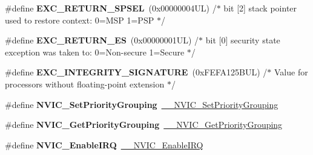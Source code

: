 \begin{DoxyCompactItemize}
\#define {\bfseries E\+X\+C\+\_\+\+R\+E\+T\+U\+R\+N\+\_\+\+S\+P\+S\+EL}~(0x00000004\+U\+L)     /$\ast$ bit \mbox{[}2\mbox{]} stack pointer used to restore context\+: 0=\+M\+S\+P 1=\+P\+S\+P           $\ast$/
\item 
\mbox{\label{group___c_m_s_i_s___core___n_v_i_c_functions_gac939dbf69d3063c76a28516a4ae84db7}} 
\#define {\bfseries E\+X\+C\+\_\+\+R\+E\+T\+U\+R\+N\+\_\+\+ES}~(0x00000001\+U\+L)     /$\ast$ bit \mbox{[}0\mbox{]} security state exception was taken to\+: 0=\+Non-\/secure 1=\+Secure $\ast$/
\item 
\mbox{\label{group___c_m_s_i_s___core___n_v_i_c_functions_ga7d1b21b2d863ccd9e23a3295b3173155}} 
\#define {\bfseries E\+X\+C\+\_\+\+I\+N\+T\+E\+G\+R\+I\+T\+Y\+\_\+\+S\+I\+G\+N\+A\+T\+U\+RE}~(0x\+F\+E\+F\+A125\+B\+U\+L)     /$\ast$ Value for processors without floating-\/point extension                $\ast$/
\item 
\mbox{\label{group___c_m_s_i_s___core___n_v_i_c_functions_ga0e798d5aec68cdd8263db86a76df788f}} 
\#define {\bfseries N\+V\+I\+C\+\_\+\+Set\+Priority\+Grouping}~\mbox{\hyperlink{group___c_m_s_i_s___core___n_v_i_c_functions_gafc94dcbaee03e4746ade1f5bb9aaa56d}{\+\_\+\+\_\+\+N\+V\+I\+C\+\_\+\+Set\+Priority\+Grouping}}
\item 
\mbox{\label{group___c_m_s_i_s___core___n_v_i_c_functions_ga4eeb9214f2264fc23c34ad5de2d3fa11}} 
\#define {\bfseries N\+V\+I\+C\+\_\+\+Get\+Priority\+Grouping}~\mbox{\hyperlink{group___c_m_s_i_s___core___n_v_i_c_functions_ga9b894af672df4373eb637f8288845c05}{\+\_\+\+\_\+\+N\+V\+I\+C\+\_\+\+Get\+Priority\+Grouping}}
\item 
\mbox{\label{group___c_m_s_i_s___core___n_v_i_c_functions_ga57b3064413dbc7459d9646020fdd8bef}} 
\#define {\bfseries N\+V\+I\+C\+\_\+\+Enable\+I\+RQ}~\mbox{\hyperlink{group___c_m_s_i_s___core___n_v_i_c_functions_ga71227e1376cde11eda03fcb62f1b33ea}{\+\_\+\+\_\+\+N\+V\+I\+C\+\_\+\+Enable\+I\+RQ}}
\item 
\mbox{\label{group___c_m_s_i_s___core___n_v_i_c_functions_ga857de13232ec65dd15087eaa15bc4a69}} 

\end{DoxyCompactItemize}
